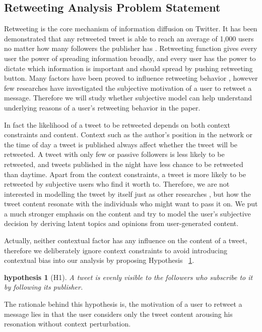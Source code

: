 \documentclass{acm_proc_article-sp}
\newtheorem{hypothesis}{hypothesis}
\begin{document}
\subsection{Retweeting Analysis Problem Statement}
\label{statement}
Retweeting is the core mechanism of information diffusion on Twitter. It has been demonstrated that any retweeted tweet is able to reach an average of 1,000 users no matter how many followers the publisher has \cite{Kwak:2010TSN}. Retweeting function gives every user the power of spreading information broadly, and every user has the power to dictate which information is important and should spread by pushing retweeting button. Many factors have been proved to influence retweeting behavior \cite{Suh2010,conf/icwsm/MacskassyM11,Comarela:2012UFA}, however few researches have investigated the subjective motivation of a user to retweet a message. Therefore we will study whether subjective model can help understand underlying reasons of a user's retweeting behavior in the paper.

In fact the likelihood of a tweet to be retweeted depends on both context constraints and content. 
Context such as the author's position in the network or the time of day a tweet is published always affect whether the tweet will be retweeted. A tweet with only few or passive followers is less likely to be retweeted, and tweets published in the night have less chance to be retweeted than daytime.
Apart from the context constraints, a tweet is more likely to be retweeted by subjective users who find it worth to. Therefore, we are not interested in modelling the tweet by itself just as other researches \cite{Naveed:2011SMC,2011:NaveedGKC,conf/icwsm/PfitznerGS12}, but how the tweet content resonate with the individuals who might want to pass it on. We put a much stronger emphasis on the content and try to model the user's subjective decision by deriving latent topics and opinions from user-generated content. 
 
Actually, neither contextual factor has any influence on the content of a tweet, therefore we deliberately ignore context constraints to avoid introducing contextual bias into our analysis by proposing  Hypothesis ~\ref{hypothesis1}. 
\begin{hypothesis}[H1]
\label{hypothesis1}
A tweet is evenly visible to the followers who subscribe to it by following its publisher.
\end{hypothesis}
The rationale behind this hypothesis is, the motivation of a user to retweet a message lies in that the user considers only the tweet content arousing his resonation without context perturbation.
\end{document}
